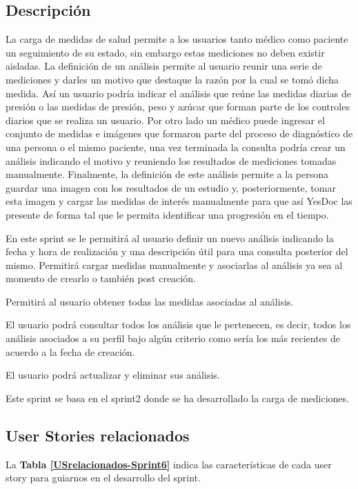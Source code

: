 \subsection{Descripción}

	La carga de medidas de salud permite a los usuarios tanto médico como paciente un seguimiento de su estado, sin embargo estas mediciones no deben existir aisladas. La definición de un análisis permite al usuario reunir una serie de mediciones y darles un motivo que destaque la razón por la cual se tomó dicha medida. Así un usuario podría indicar el análisis que reúne las medidas diarias de presión o las medidas de presión, peso y azúcar que forman parte de los controles diarios que se realiza un usuario. Por otro lado un médico puede ingresar el conjunto de medidas e imágenes que formaron parte del proceso de diagnóstico de una persona o el mismo paciente, una vez terminada la consulta podría crear un análisis indicando el motivo y reuniendo los resultados de mediciones tomadas manualmente. Finalmente, la definición de este análisis permite a la persona guardar una imagen con los resultados de un estudio y, posteriormente, tomar esta imagen y cargar las medidas de interés manualmente para que así YesDoc las presente de forma tal que le permita identificar una progresión en el tiempo.
	
	En este sprint se le permitirá al usuario definir un nuevo análisis indicando la fecha y hora de realización y una descripción útil para una consulta posterior del mismo. Permitirá cargar medidas manualmente y asociarlas al análisis ya sea al momento de crearlo o también post creación.
	
	Permitirá al usuario obtener todas las medidas asociadas al análisis.
	
	El usuario podrá consultar todos los análisis que le pertenecen, es decir, todos los análisis asociados a su perfil bajo algún criterio como sería los más recientes de acuerdo a la fecha de creación. 
	
	El usuario podrá actualizar y eliminar sus análisis.
	
	Este sprint se basa en el sprint2 donde se ha desarrollado la carga de mediciones.
	 

\subsection{User Stories relacionados}
La \textbf{Tabla \ref{USrelacionados-Sprint6}} indica las características de cada user story para guiarnos en el desarrollo del sprint.

